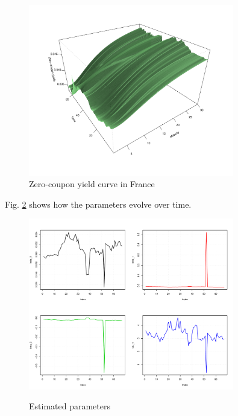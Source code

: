 \begin{figure}[htb]
  \begin{center}
  \caption{Zero-coupon yield curve in France}
  \label{fig:3dplot}
\includegraphics[width=0.8\textwidth]{3dplot}
\end{center}
\end{figure}

Fig. \ref{fig:paramdevel} shows how the parameters evolve over time.

\begin{figure}[htb]
  \begin{center}
  \caption{Estimated parameters}
\includegraphics[width=0.8\textwidth]{paramdevel}
\label{fig:paramdevel}
\end{center}
\end{figure}




